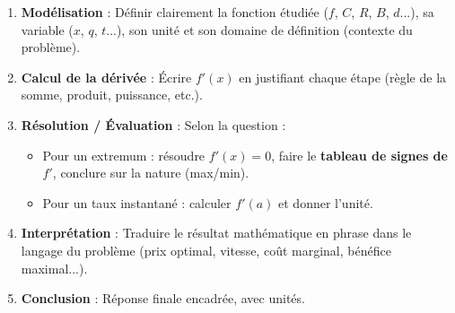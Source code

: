 \documentclass[11pt]{article}
\begin{document}
\begin{methode}
\begin{enumerate}
\item \textbf{Modélisation} : Définir clairement la fonction étudiée ($f$, $C$, $R$, $B$, $d$...), sa variable ($x$, $q$, $t$...), son unité et son domaine de définition (contexte du problème).
\item \textbf{Calcul de la dérivée} : Écrire $f'(x)$ en justifiant chaque étape (règle de la somme, produit, puissance, etc.).
\item \textbf{Résolution / Évaluation} : Selon la question :
\begin{itemize}
\item Pour un extremum : résoudre $f'(x)=0$, faire le \textbf{tableau de signes de $f'$}, conclure sur la nature (max/min).
\item Pour un taux instantané : calculer $f'(a)$ et donner l'unité.
\end{itemize}
\item \textbf{Interprétation} : Traduire le résultat mathématique en phrase dans le langage du problème (prix optimal, vitesse, coût marginal, bénéfice maximal...).
\item \textbf{Conclusion} : Réponse finale encadrée, avec unités.
\end{enumerate}
\end{methode}
\end{document}
